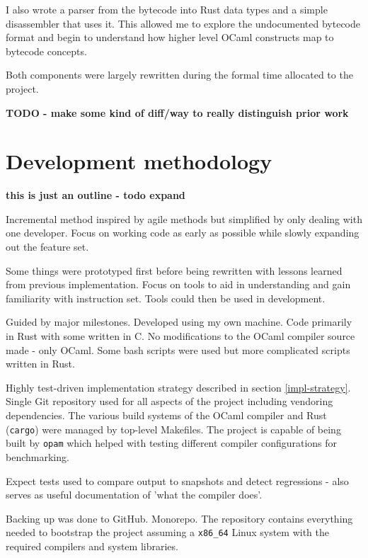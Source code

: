 I also wrote a parser from the bytecode into Rust data types and a simple disassembler that uses
it. This allowed me to explore the undocumented bytecode format and begin to understand how higher
level OCaml constructs map to bytecode concepts.

Both components were largely rewritten during the formal time allocated to the project.

\textbf{TODO - make some kind of diff/way to really distinguish prior work}

\section{Development methodology}

\textbf{this is just an outline - todo expand}

Incremental method inspired by agile methods but simplified by only dealing with one developer.
Focus on working code as early as possible while slowly expanding out the feature set.

Some things were prototyped first before being rewritten with lessons learned from previous
implementation. Focus on tools to aid in understanding and gain familiarity with instruction set.
Tools could then be used in development.

Guided by major milestones.  Developed using my own machine. Code primarily in Rust with some
written in C. No modifications to the OCaml compiler source made - only OCaml. Some bash scripts
were used but more complicated scripts written in Rust.

Highly test-driven implementation strategy described in section \ref{impl-strategy}. Single Git
repository used for all aspects of the project including vendoring dependencies. The various build
systems of the OCaml compiler and Rust (\texttt{cargo}) were managed by top-level Makefiles. The
project is capable of being built by \texttt{opam} which helped with testing different compiler
configurations for benchmarking.

Expect tests used to compare output to snapshots and detect regressions - also serves as useful
documentation of 'what the compiler does'.

Backing up was done to GitHub. Monorepo. The repository contains everything needed to bootstrap the
project assuming a \texttt{x86\_64} Linux system with the required compilers and system libraries.
